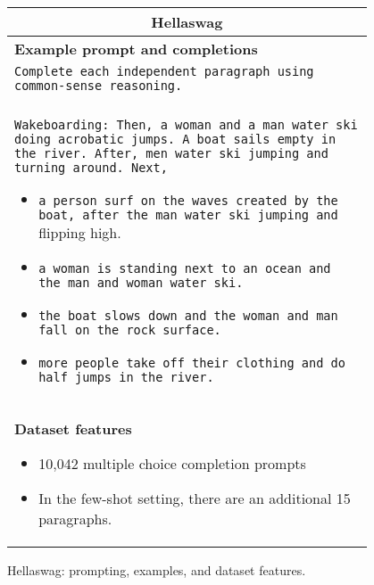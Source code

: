 \begin{figure}[p]
    \centering \small
    \begin{tabular}{p{0.95\linewidth}}
    \toprule
    \multicolumn{1}{c}{\textbf{Hellaswag}} \\

    \midrule
    \textbf{Example prompt and completions}  \\
    \texttt{Complete each independent paragraph using common-sense reasoning.} \\\\
    \texttt{Wakeboarding: Then, a woman and a man water ski doing acrobatic jumps. A boat sails empty in the river. After, men water ski jumping and turning around. Next,}
    \begin{itemize}
        \item \texttt{a person surf on the waves created by the boat, after the man water ski jumping and }flipping high.
        \item \texttt{a woman is standing next to an ocean and the man and woman water ski.}
        \item \texttt{the boat slows down and the woman and man fall on the rock surface.}
        \item \texttt{more people take off their clothing and do half jumps in the river.}
    \end{itemize} \\

    \midrule
    \textbf{Dataset features}
    \begin{itemize}
        \item 10,042 multiple choice completion prompts
        \item In the few-shot setting, there are an additional 15 paragraphs.
    \end{itemize} \\

    \bottomrule
    \end{tabular}
    \caption{Hellaswag: prompting, examples, and dataset features.}
    \label{tab:prompt-hellaswag}
\end{figure}

